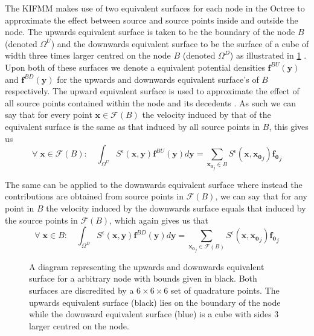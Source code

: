 The KIFMM makes use of two equivalent surfaces for each node in the Octree to approximate the effect between source and source points inside and outside the node. The upwards equivalent surface is taken to be the boundary of the node $B$ (denoted $\Omega^U$) and the downwards equivalent surface to be the surface of a cube of width three times larger centred on the node $B$ (denoted $\Omega^D$) as illustrated in \cref{fig:UpandDownsurf} \cite{Ying2004}. Upon both of these surfaces we denote a equivalent potential densities $\mathbf{f}^{BU}(\mathbf{y})$ and $\mathbf{f}^{BD}(\mathbf{y})$ for the upwards and downwards equivalent surface's of $B$ respectively. The upward equivalent surface is used to approximate the effect of all source points contained within the node and its decedents \cite{Rostami2016Kernel-independentStokeslets}. As such we can say that for every point $\mathbf{x}\in\mathcal{F}(B)$ the velocity induced by that of the equivalent surface is the same as that induced by all source points in $B$, this gives us
\begin{equation}
\label{eq:upsurfint}
    \forall \;\mathbf{x} \in \mathcal{F}(B): \quad \int_{\Omega^U} S^\epsilon(\mathbf{x}, \mathbf{y}) \mathbf{f}^{BU}(\mathbf{y}) d \mathbf{y}=\sum_{\mathbf{x_0}_j \in B} S^\epsilon\left(\mathbf{x}, \mathbf{x_0}_j\right) \mathbf{f_0}_{j}
\end{equation}

The same can be applied to the downwards equivalent surface where instead the contributions are obtained from source points in $\mathcal{F}(B)$, we can say that for any point in $B$ the velocity induced by the downwards surface equals that induced by the source points in $\mathcal{F}(B)$, which again gives us that
\begin{equation}
\label{eq:downsurfint}
    \forall \;\mathbf{x} \in B: \quad \int_{\Omega^D} S^\epsilon(\mathbf{x}, \mathbf{y}) \mathbf{f}^{BD}(\mathbf{y}) d \mathbf{y}=\sum_{\mathbf{x_0}_j \in \mathcal{F}(B)} S^\epsilon\left(\mathbf{x}, \mathbf{x_0}_j\right) \mathbf{f_0}_{j}
\end{equation}

\begin{figure}[ht]
    \centering
    \resizebox{.6\linewidth}{!}{}
    \caption{A diagram representing the upwards and downwards equivalent surface for a arbitrary node with bounds given in black. Both surfaces are discredited by a $6 \times 6 \times 6$ set of quadrature points. The upwards equivalent surface (black) lies on the boundary of the node while the downward equivalent surface (blue) is a cube with sides 3 larger centred on the node. }
    \label{fig:UpandDownsurf}
\end{figure}

